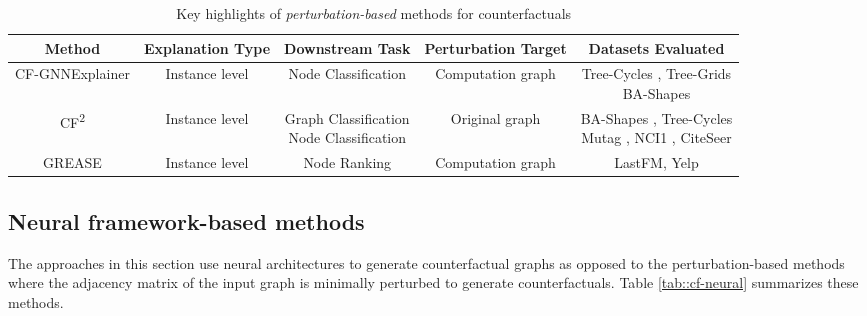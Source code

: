
\begin{table}[tb]
  \centering
  \scriptsize
  \caption{Key highlights of \textit{perturbation-based} methods for counterfactuals}
    \begin{tabular}{ccccc}
    \toprule
        \textbf{Method} & \textbf{Explanation Type} & \textbf{Downstream Task} & \textbf{Perturbation Target} & \textbf{Datasets Evaluated}  \\  \midrule
        CF-GNNExplainer \cite{cfgnnex} & Instance level  & Node Classification  & Computation graph  & \makecell{Tree-Cycles \cite{ying2019gnnexplainer}, Tree-Grids \cite{ying2019gnnexplainer}\\BA-Shapes \cite{ying2019gnnexplainer}}  \\  \hline
        CF\textsuperscript{2} \cite{cf^2-counter}  &  Instance level & \makecell{Graph Classification\\Node Classification}  & Original graph & \makecell{BA-Shapes \cite{ying2019gnnexplainer}, Tree-Cycles \cite{ying2019gnnexplainer} \\ Mutag \cite{mutag}, NCI1 \cite{NCI1_data}, CiteSeer \cite{getoor2005advanced}} \\  \hline
        GREASE \cite{chen2022grease}  & Instance level  &  Node Ranking & Computation graph & LastFM, Yelp \\  \bottomrule
    \end{tabular}%
  \label{tab::cf-perturbation}%
\end{table}%


\subsection{Neural framework-based methods}
The approaches in this section use neural architectures to generate counterfactual graphs as opposed to the perturbation-based methods where the adjacency matrix of the input graph is minimally perturbed to generate counterfactuals. Table \ref{tab::cf-neural} summarizes these methods.

